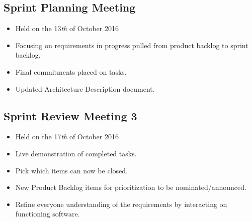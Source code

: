 \documentclass[a4paper]{article}
\begin{document}
\subsection{Sprint Planning Meeting}

\begin{itemize}
\item Held on the 13\textit{th} of October 2016
\item Focusing on requirements in progress pulled from product backlog to sprint backlog.
\item Final commitments placed on tasks.
\item Updated Architecture Description document.
\end{itemize}

\subsection{Sprint Review Meeting 3}

\begin{itemize}
\item Held on the 17\textit{th} of October 2016
\item Live demonstration of completed tasks.
\item Pick which items can now be closed.
\item New Product Backlog items for prioritization to be nominated/announced.
\item Refine everyone understanding of the requirements by interacting on functioning software.
\end{itemize}
\end{document}
